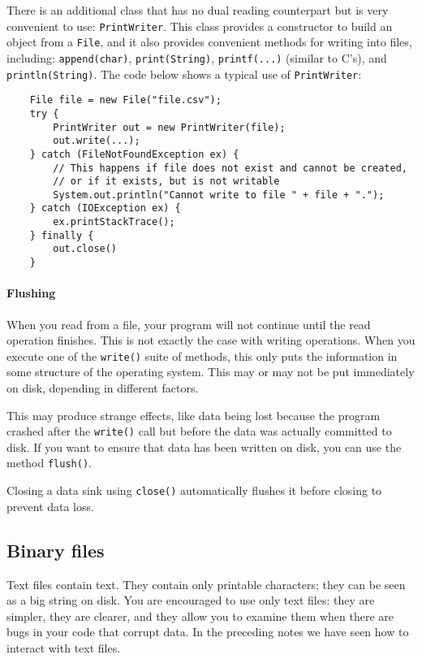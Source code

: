 There is an additional class that has no dual reading counterpart but
is very convenient to use: \verb+PrintWriter+. This class provides a
constructor to build an object from a \verb+File+, and it also provides 
convenient methods for writing into files, including: 
\verb+append(char)+, 
\verb+print(String)+, 
\verb+printf(...)+ (similar to C's), 
and 
\verb+println(String)+.
The code below shows a typical use of \verb+PrintWriter+: 

\begin{verbatim}
    File file = new File("file.csv");
    try {
        PrintWriter out = new PrintWriter(file); 
        out.write(...);
    } catch (FileNotFoundException ex) {
        // This happens if file does not exist and cannot be created, 
        // or if it exists, but is not writable
        System.out.println("Cannot write to file " + file + ".");
    } catch (IOException ex) {
        ex.printStackTrace();
    } finally { 
        out.close()
    }    
\end{verbatim}


\paragraph{Flushing}
\label{sec:flushing}

When you read from a file, your program will not continue until the
read operation finishes. This is not exactly the case with writing
operations. When you execute one of the \verb+write()+ suite of methods, this only
puts the information in some structure of the operating system. This
may or may not be put immediately on disk, depending in different
factors. 

This may produce strange effects, like data being lost because the
program crashed after the \verb+write()+ call but before the data was
actually committed to disk. If you want to ensure that data has been
written on disk, you can use the method \verb+flush()+. 

Closing a data sink using \verb+close()+ 
automatically flushes it before closing to prevent data loss. 


\subsection{Binary files}
\label{sec:binary-files}

Text files contain text. They contain only printable characters; they
can be seen as a big string on disk. You are encouraged to
use only text files: they are simpler, they are clearer, and they
allow you to examine them when there are bugs in your code that
corrupt data. In the
preceding notes we have seen how to interact with text files. 

